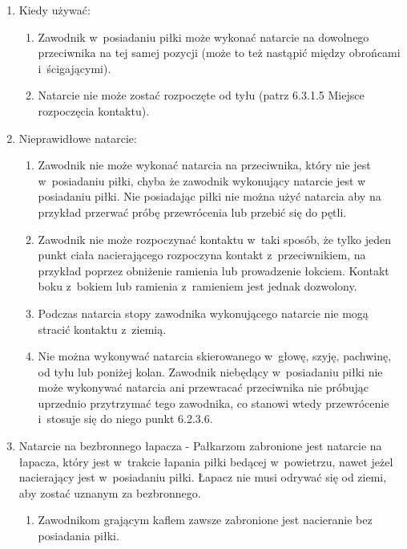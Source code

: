 \documentclass[12pt,a4paper]{article}
\begin{document}
\begin{enumerate}
	\item
	      Kiedy używać:

	      \begin{enumerate}
		      \item
		            Zawodnik w~posiadaniu piłki może wykonać natarcie na dowolnego
		            przeciwnika na tej samej pozycji (może to też nastąpić między
		            obrońcami i~ścigającymi).
		      \item
		            Natarcie nie może zostać rozpoczęte od tyłu (patrz 6.3.1.5 Miejsce
		            rozpoczęcia kontaktu).
	      \end{enumerate}
	\item
	      Nieprawidłowe natarcie:

	      \begin{enumerate}
		      \item
		            Zawodnik nie może wykonać natarcia na przeciwnika, który nie jest w~posiadaniu piłki, chyba że zawodnik wykonujący natarcie jest w posiadaniu piłki. Nie posiadając piłki nie można użyć natarcia aby na przykład przerwać próbę przewrócenia lub przebić się do pętli.
		      \item
		            Zawodnik nie może rozpoczynać kontaktu w~taki sposób, że tylko jeden
		            punkt ciała nacierającego rozpoczyna kontakt z~przeciwnikiem, na
		            przykład poprzez obniżenie ramienia lub prowadzenie łokciem. Kontakt
		            boku z~bokiem lub ramienia z~ramieniem jest jednak dozwolony.
		      \item
		            Podczas natarcia stopy zawodnika wykonującego natarcie nie mogą
		            stracić kontaktu z~ziemią.
		      \item
		            Nie można wykonywać natarcia skierowanego w~głowę, szyję, pachwinę,
		            od tyłu lub poniżej kolan. Zawodnik niebędący w~posiadaniu piłki nie
		            może wykonywać natarcia ani przewracać przeciwnika nie próbując
		            uprzednio przytrzymać tego zawodnika, co stanowi wtedy przewrócenie
		            i~stosuje się do niego punkt 6.2.3.6.
	      \end{enumerate}
	\item
	      Natarcie na bezbronnego łapacza - Pałkarzom zabronione jest natarcie na
	      łapacza, który jest w~trakcie łapania piłki bedącej w~powietrzu, nawet
	      jeżel nacierający jest w~posiadaniu piłki. Łapacz nie musi odrywać się
	      od ziemi, aby zostać uznanym za bezbronnego.

	      \begin{enumerate}
		      \item
		            Zawodnikom grającym kaflem zawsze zabronione jest nacieranie bez
		            posiadania piłki.
	      \end{enumerate}
\end{enumerate}
\end{document}
